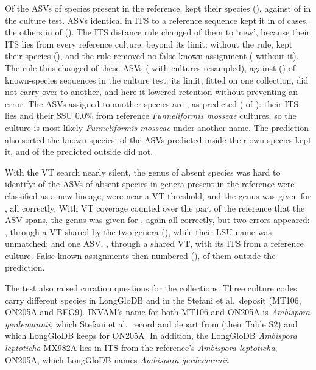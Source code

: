 \documentclass[11pt]{article}
\newcommand{\spn}[1]{\emph{#1}}   %
\begin{document}
Of the \LgKnownN{} ASVs of species present in the reference, \LgKept{} kept their species (\LgKeptPct{}), against
\KnownKeptITS{} of \KnownN{} in the culture test. ASVs identical in ITS to a reference sequence kept it in
\LgIdentKept{} of \LgIdentN{} cases, the others in \LgNonIdentKept{} of \LgNonIdentN{} (\LgNonIdentKeptPct{}). The ITS
distance rule changed \LgNSixDemoted{} of them to `new', because their ITS lies \LgNSixDemotedITSRange{} from every
reference culture, beyond its \LgNSixThreshold{} limit: without the rule, \LgKeptvOne{} kept their species
(\LgKeptvOnePct{}), and the rule removed no false-known assignment (\LgFKvOne{} without it). The rule thus changed
\CiLgDemotedPct{} of these ASVs (\CiLgDemotedCu{} with cultures resampled), against \ITSDemotedKnownPct{}
(\CiDemotedCu{}) of known-species sequences in the culture test: its limit, fitted on one collection, did not carry
over to another, and here it lowered retention without preventing an error. The \LgWrongSp{} ASVs assigned to
another species are \LgWrongSpDetail{}, as predicted (\LgWrongSpPredicted{} of \LgWrongSp{}): their ITS lies
\LgWrongSpITSRange{} and their SSU 0.0\% from reference \spn{Funneliformis mosseae} cultures, so the culture is most
likely \spn{Funneliformis mosseae} under another name. The prediction also sorted the known species:
\LgPredInsideOwnKept{} of the \LgPredInsideOwn{} ASVs predicted inside their own species kept it, and
\LgPredOutsideOwnNotKept{} of the \LgPredOutsideOwn{} predicted outside did not.

With the VT search nearly silent, the genus of absent species was hard to identify: \LgNovelSpAsLineage{} of the
\LgNovelSpN{} ASVs of absent species in genera present in the reference were classified as a new lineage,
\LgBoundary{} were near a VT threshold, and the genus was given for \LgGenusRight{}, all correctly. With VT coverage
counted over the part of the reference that the ASV spans, the genus was given for \LgSecGenusRight{}, again all
correctly, but two errors appeared: \LgSecWrongGenusDetail{}, through a VT shared by the two genera
(\LgSecWrongGenusVT{}), while their LSU name was unmatched; and one ASV, \LgSecExtraFKDetail{}, through a shared VT,
with its ITS \LgSecExtraFKITS{} from a reference culture. False-known assignments then numbered \LgSecFK{}
(\LgSecFKPct{}), \LgSecFKOutsideLocked{} of them outside the prediction.

The test also raised curation questions for the collections. Three culture codes carry different species in
LongGloDB and in the Stefani et al.\ deposit (MT106, ON205A and BEG9). INVAM's name for both MT106 and ON205A is
\spn{Ambispora gerdemannii}, which Stefani et al.\ record and depart from (their Table S2) and which LongGloDB keeps
for ON205A. In addition, the LongGloDB \spn{Ambispora leptoticha} MX982A lies \LgLeptoMXITS{} in ITS from the
reference's \spn{Ambispora leptoticha}, ON205A, which LongGloDB names \spn{Ambispora gerdemannii}.

\end{document}
